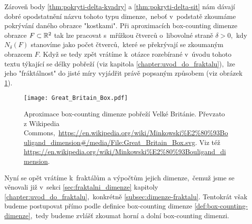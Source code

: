 Zároveň body \ref{thm:pokryti-delta-kvadry} a \ref{thm:pokryti-delta-sit} nám dávají dobré opodstatnění názvu tohoto typu dimenze,~neboť v~podstatě zkoumáme pokrývání daného obrazce "kostkami". Při aproximacích box-counting dimenze obrazce $F\subset\mathbb{R}^2$ tak lze pracovat s~mřížkou čtverců o~libovolné straně $\delta>0$,~kdy $N_\delta(F)$ stanovíme jako počet čtverců,~které se překrývají se zkoumaným obrazcem $F$. Když se tedy zpět vrátíme k~otázce rozebírané v~úvodu tohoto textu týkající se délky pobřeží (viz kapitola \ref{chapter:uvod_do_fraktalu}),~lze jeho "fráktálnost" do jisté míry vyjádřit právě popsaným způsobem (viz obrázek \ref{fig:aproximace-delky-pobrezi-vb}).
\begin{figure}[h]
    \centering
    \texttt{[image: Great\_Britain\_Box.pdf]}
    \caption{Aproximace box-counting dimenze pobřeží Velké Británie. Převzato z Wikipedia Commons,~\url{https://en.wikipedia.org/wiki/Minkowski\%E2\%80\%93Bouligand\_dimension\#/media/File:Great\_Britain\_Box.svg}. Viz též \url{https://en.wikipedia.org/wiki/Minkowski\%E2\%80\%93Bouligand\_dimension}.}
    \label{fig:aproximace-delky-pobrezi-vb}
\end{figure}
Nyní se opět vrátíme k~fraktálům a výpočtům jejich dimenze,~čemuž jsme se věnovali již v~sekci \ref{sec:fraktalni_dimenze} kapitoly \ref{chapter:uvod_do_fraktalu},~konkrétně \ref{subsec:dimenze-fraktalu}. Tentokrát však budeme postupovat přímo podle definice box-counting dimenze \ref{def:box-counting-dimenze},~tedy budeme zvlášť zkoumat horní a dolní box-counting dimenzi.
